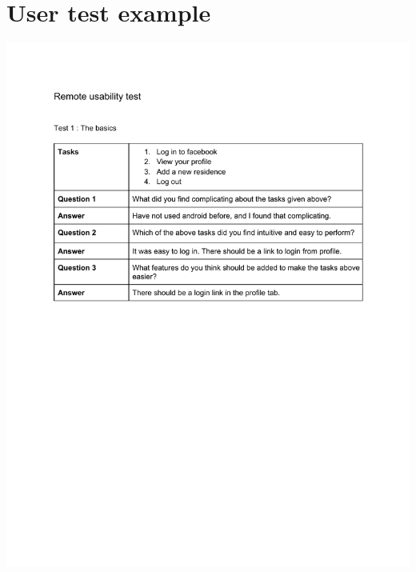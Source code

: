 \chapter{User test example}
\label{sec:userTestExample}
\includegraphics[scale=1, trim=20mm 140mm 20mm 20mm, clip]{appendix/userTesting/userTest.pdf}

